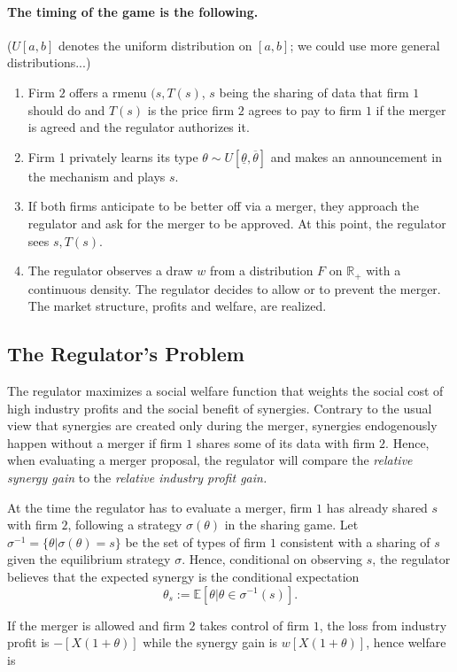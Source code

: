 \documentclass[a4paper]{article}
\newcommand{\E}{\mathbb E}
\renewcommand{\t}{\theta}
\begin{document}
\paragraph{The timing of the game is the following.} ($U[a,b]$ denotes the uniform distribution on $[a,b]$; we could use more general distributions...)
\begin{enumerate}\setlength\itemsep{0em}
    \item Firm $2$ offers a rmenu $(s,T(s)$, $s$ being the sharing of data that firm $1$ should do and $T(s)$ is the price firm $2$ agrees to pay to firm $1$ if the merger is agreed and the regulator authorizes it.
    \item Firm 1 privately learns its type $\t\sim U[\underline{\t},\overline{\t}]$ and makes an announcement in the mechanism and plays $s$.
    \item If both firms anticipate to be better off via a merger, they approach the regulator  and ask for the merger to be approved. At this point, the regulator sees $s,T(s)$.
    \item The regulator observes a draw $w$ from a distribution $F$ on $\mathbb R_+$ with a continuous density. The regulator decides to allow or to prevent the merger. The market structure, profits and welfare, are realized.
\end{enumerate}
%
\subsection{The Regulator's Problem}
   The regulator maximizes a social welfare function that weights the social cost of high industry profits and the social benefit of synergies. Contrary to the usual view that synergies are created only during the merger, synergies endogenously happen without a merger if firm $1$ shares some of its data with firm $2$. Hence, when evaluating a merger proposal, the regulator will compare the \emph{relative synergy gain} to the \emph{relative industry profit gain.}

   At the time the regulator has to evaluate a merger, firm $1$ has already shared $s$ with firm $2$, following a strategy $\sigma(\t)$ in the sharing game.  Let $\sigma^{-1}=\{\t|\sigma(\t)=s\}$ be the set of types of firm $1$ consistent with a sharing of $s$ given the equilibrium strategy $\sigma$. Hence, conditional on observing $s$, the regulator believes that the expected synergy is the conditional expectation $$\t_s:=\E[\t|\t\in\sigma^{-1}(s)].$$
     
    If the merger is allowed and firm $2$ takes control of firm $1$, the loss from industry profit is $-[X(1+\t)]$ while the synergy gain is $w[X(1+\t)]$, hence welfare is
    
\end{document}
